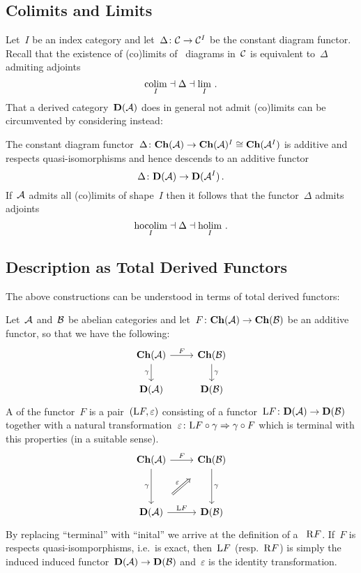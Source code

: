 \documentclass[a4paper,10pt]{scrartcl}
\begin{document}
\subsection{Colimits and Limits}

Let~$I$ be an index category and let~$\Delta \colon \mathcal{C} \to \mathcal{C}^I$ be the constant diagram functor.
Recall that the existence of (co)limits of~{} diagrams in~$\mathcal{C}$ is equivalent to~$\Delta$ admiting adjoints
\[
  \operatorname*{colim}_I \mathrel{\dashv} \Delta \mathrel{\dashv} \lim_I \,.
\]
That a derived category~$\mathbf{D}(\mathcal{A})$ does in general not admit (co)limits can be circumvented by considering  instead:

The constant diagram functor~$\Delta \colon \mathbf{Ch}(\mathcal{A}) \to \mathbf{Ch}(\mathcal{A})^I \cong \mathbf{Ch}(\mathcal{A}^I)$ is additive and respects quasi-isomorphisms and hence descends to an additive functor
\[
  \Delta
  \colon
  \mathbf{D}(\mathcal{A}) \to \mathbf{D}(\mathcal{A}^I) \,.
\]
If~$\mathcal{A}$ admits all (co)limits of shape~$I$ then it follows that the functor~$\Delta$ admits adjoints
\[
  \operatorname*{hocolim}_I \mathrel{\dashv} \Delta \mathrel{\dashv} \operatorname*{holim}_I \,.
\]



\subsection{Description as Total Derived Functors}

The above constructions can be understood in terms of total derived functors:

Let~$\mathcal{A}$ and~$\mathcal{B}$ be abelian categories and let~$F \colon \mathbf{Ch}(\mathcal{A}) \to \mathbf{Ch}(\mathcal{B})$ be an additive functor, so that we have the following:
\[
  \begin{tikzcd}
    \Ch(\Acat)
    \arrow{r}[above]{F}
    \arrow{d}[left]{\gamma}
    &
    \Ch(\Bcat)
    \arrow{d}[right]{\gamma}
    \\
    \Derived(\Acat)
    &
    \Derived(\Bcat)
  \end{tikzcd}
\]
A  of the functor~$F$ is a pair~$(\mathrm{L} F, \varepsilon)$ consisting of a functor~$\mathrm{L} F \colon \mathbf{D}(\mathcal{A}) \to \mathbf{D}(\mathcal{B})$ together with a natural transformation~$\varepsilon \colon \mathrm{L} F \circ \gamma \Rightarrow \gamma \circ F$ which is terminal with this properties (in a suitable sense).
\[
  \begin{tikzcd}[row sep = huge]
    \Ch(\Acat)
    \arrow{r}[above]{F}
    \arrow{d}[left]{\gamma}
    &
    \Ch(\Bcat)
    \arrow{d}[right]{\gamma}
    \\
    \Derived(\Acat)
    \arrow{r}[above]{\Left F}
    \arrow[Rightarrow, shorten <= 1.5em, shorten >= 1.5em]{ur}[above left]{\varepsilon}
    &
    \Derived(\Bcat)
  \end{tikzcd}
\]
By replacing \enquote{terminal} with \enquote{inital} we arrive at the definition of a ~$\mathrm{R} F$.
If~$F$ is respects quasi-isomporphisms, i.e.\ is exact, then~$\mathrm{L} F$ (resp.~$\mathrm{R} F$) is simply the induced induced functor~$\mathbf{D}(\mathcal{A}) \to \mathbf{D}(\mathcal{B})$ and~$\varepsilon$ is the identity transformation.
\end{document}
